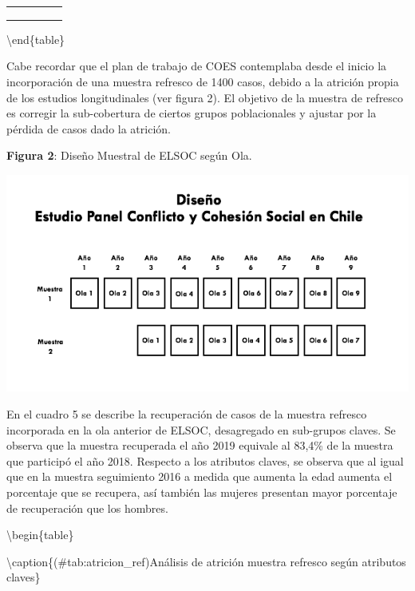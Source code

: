 \documentclass[
]{book}
\begin{document}
\begin{tabular}[t]{>{\raggedright\arraybackslash}p{4cm}>{\raggedright\arraybackslash}p{3.5cm}>{\raggedright\arraybackslash}p{3cm}>{\raggedright\arraybackslash}p{3.5cm}>{\raggedright\arraybackslash}p{3.5cm}}
\hspace{1em}\cellcolor{white}{50-64 años} & \cellcolor{white}{91.3} & \cellcolor{white}{94.6} & \cellcolor{white}{86.4} & \cellcolor{white}{85.7}\\
\hspace{1em}\cellcolor{white}{65 años y más} & \cellcolor{white}{92.7} & \cellcolor{white}{103.6} & \cellcolor{white}{96.0} & \cellcolor{white}{99.1}\\
\cellcolor{white}{Total} & \cellcolor{white}{84.5} & \cellcolor{white}{90.1} & \cellcolor{white}{76.2} & \cellcolor{white}{73.6}\\
\bottomrule
\end{tabular}

\textbackslash end\{table\}

Cabe recordar que el plan de trabajo de COES contemplaba desde el inicio la incorporación de una muestra refresco de 1400 casos, debido a la atrición propia de los estudios longitudinales (ver figura 2). El objetivo de la muestra de refresco es corregir la sub-cobertura de ciertos grupos poblacionales y ajustar por la pérdida de casos dado la atrición.

\textbf{Figura 2}: Diseño Muestral de ELSOC según Ola.

\begin{center}\includegraphics[width=0.6\linewidth,height=0.6\textheight]{imagenes/design} \end{center}

En el cuadro 5 se describe la recuperación de casos de la muestra refresco incorporada en la ola anterior de ELSOC, desagregado en sub-grupos claves. Se observa que la muestra recuperada el año 2019 equivale al 83,4\% de la muestra que participó el año 2018. Respecto a los atributos claves, se observa que al igual que en la muestra seguimiento 2016 a medida que aumenta la edad aumenta el porcentaje que se recupera, así también las mujeres presentan mayor porcentaje de recuperación que los hombres.

\textbackslash begin\{table\}

\textbackslash caption\{(\#tab:atricion\_ref)\label{tab:hogares}Análisis de atrición muestra refresco según atributos claves\}
\centering
\end{document}
